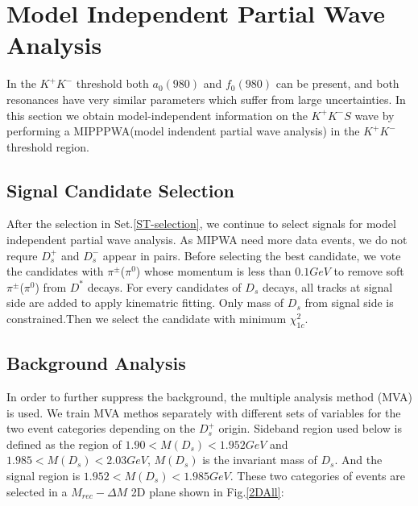 \section{Model Independent Partial Wave Analysis}
\par{In the $K^{+}K^{-}$ threshold both $a_{0}(980)$ and $f_{0}(980)$ can be present, and both resonances have very similar parameters which suffer from large uncertainties. In this section we obtain model-independent information on the $K^{+}K^{-} S$ wave by performing a MIPPPWA(model indendent partial wave analysis) in the  $K^{+}K^{-}$ threshold region.}
\subsection{Signal Candidate Selection}
\label{MIPWASelection}
\par{
    After the selection in Set.\ref{ST-selection}, we continue to select signals for model independent partial wave analysis.
    As MIPWA need more data events, we do not requre $D_{s}^{+}$ and $D_{s}^{-}$ appear in pairs. 
Before selecting the best candidate,  we vote the candidates with $\pi^{\pm}$($\pi^{0}$) whose momentum is less than $0.1GeV$ to remove soft $\pi^{\pm}$($\pi^{0}$) from $D^{*}$ decays.
For every candidates of $D_{s}$ decays, all tracks at signal side are added to apply kinematric fitting. Only mass of $D_{s}$ from signal side is constrained.Then we select the candidate with minimum $\chi_{1c}^{2}$.
}
\subsection{Background Analysis}
In order to further suppress the background, the multiple analysis method (MVA) is used. We train MVA methos separately with different sets of variables for the two event categories depending on the $D_{s}^{+}$ origin. 
Sideband region used below is defined as the region of  $1.90 < M(D_{s}) < 1.952 GeV$ and   $1.985 < M(D_{s}) < 2.03 GeV$, $M(D_{s})$ is the invariant mass of $D_{s}$.
And the signal region is $1.952 < M(D_{s}) < 1.985 GeV$.
These two categories of events are selected in a $M_{rec}-\Delta{M}$ 2D plane shown in Fig.\ref{2DAll}:




